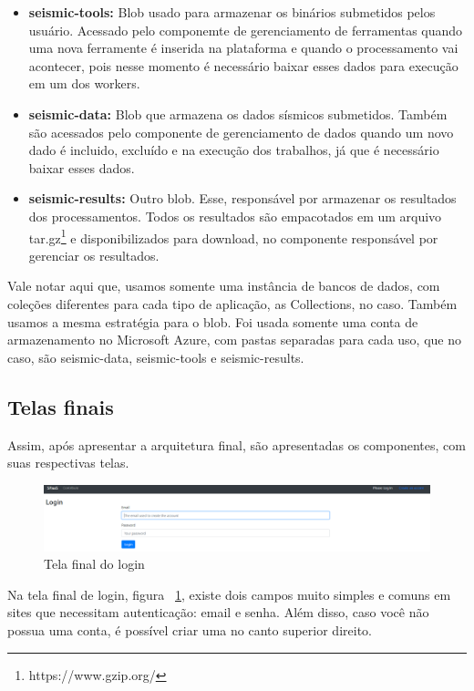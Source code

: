 \documentclass[11pt,twoside]{article}
\begin{document}
\begin{itemize}
  \item \textbf{seismic-tools:} Blob usado para armazenar os binários submetidos pelos usuário. Acessado pelo componemte de gerenciamento de ferramentas quando uma nova ferramente é inserida na plataforma 
  e quando o processamento vai acontecer, pois nesse momento é necessário baixar esses dados para execução em um dos workers.
  \item \textbf{seismic-data:} Blob que armazena os dados sísmicos submetidos. Também são acessados pelo componente de gerenciamento de dados quando um novo dado é incluido, excluído e na execução dos 
  trabalhos, já que é necessário baixar esses dados.
  \item \textbf{seismic-results:} Outro blob. Esse, responsável por armazenar os resultados dos processamentos. Todos os resultados são empacotados em um arquivo tar.gz\footnote{https://www.gzip.org/} e disponibilizados para download, 
  no componente responsável por gerenciar os resultados.
\end{itemize}

Vale notar aqui que, usamos somente uma instância de bancos de dados, com coleções diferentes para cada tipo de aplicação, as Collections, no caso. Também usamos a mesma estratégia para o blob. Foi usada somente 
uma conta de armazenamento no Microsoft Azure, com pastas separadas para cada uso, que no caso, são seismic-data, seismic-tools e seismic-results. 

\subsection{Telas finais}

Assim, após apresentar a arquitetura final, são apresentadas os componentes, com suas respectivas telas. 

\begin{figure}[!h]
  \centering
  \includegraphics[scale=0.3]{final_login.eps}
  \caption{Tela final do login}
  \label{fig:finalLogin}
\end{figure}

Na tela final de login, figura ~\ref{fig:finalLogin}, existe dois campos muito simples e comuns em sites que necessitam autenticação: email e senha. Além disso, caso você não possua uma conta, é possível criar uma no canto superior direito.
\end{document}
